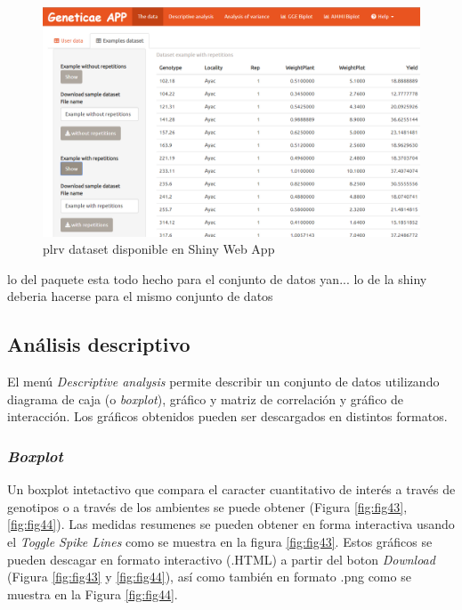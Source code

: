 \begin{figure}[H]
	\begin{center}
		\includegraphics[width=14cm]{./Graficos/Exampledatasets_withrep.png}
	\end{center}
	\caption{plrv dataset disponible en Shiny Web App}
	\label{fig:fig42}
\end{figure}

{\LARGE{lo del paquete esta todo hecho para el conjunto de datos yan... lo de la shiny deberia hacerse para el mismo conjunto de datos}}

\subsection{Análisis descriptivo}
El menú \emph{Descriptive analysis} permite describir un conjunto de datos utilizando diagrama de caja (o \emph{boxplot}), gráfico y matriz de correlación y gráfico de interacción. Los gráficos obtenidos pueden ser descargados en distintos formatos.

\subsubsection{\emph{Boxplot}}
Un boxplot intetactivo que compara el caracter cuantitativo de interés a través de genotipos o a través de los ambientes se puede obtener (Figura \ref{fig:fig43},\ref{fig:fig44}). Las medidas resumenes se pueden obtener en forma interactiva usando el \emph{Toggle Spike Lines} como se muestra en la figura \ref{fig:fig43}. Estos gráficos se pueden descagar en formato interactivo (.HTML) a partir del boton \emph{Download} (Figura \ref{fig:fig43} y \ref{fig:fig44}), así como también en formato .png como se muestra en la Figura \ref{fig:fig44}.


